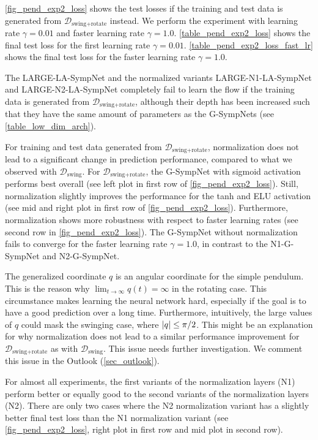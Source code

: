 \documentclass[twoside,a4paper]{article}
\begin{document}
\cref{fig_pend_exp2_loss} shows the test losses if the training and test data
is generated from $\mathcal{D}_{\text{swing+rotate}}$ instead.
We perform the experiment with learning rate $\gamma = 0.01$ and faster learning rate $\gamma = 1.0$.
\cref{table_pend_exp2_loss} shows the final test loss for the first learning rate $\gamma = 0.01$.
\cref{table_pend_exp2_loss_fast_lr} shows the final test loss for the faster learning rate $\gamma = 1.0$.

The LARGE-LA-SympNet and the normalized variants LARGE-N1-LA-SympNet and LARGE-N2-LA-SympNet completely fail to learn the
flow if the training data is generated from $\mathcal{D}_{\text{swing+rotate}}$, 
although their depth has been increased such that they have the same amount of parameters 
as the G-SympNets (see \cref{table_low_dim_arch}).

For training and test data generated from $\mathcal{D}_{\text{swing+rotate}}$, 
normalization does not lead to a significant change in prediction performance, compared to
what we observed with $\mathcal{D}_{\text{swing}}$. For $\mathcal{D}_{\text{swing+rotate}}$,
the G-SympNet with sigmoid activation performs best overall
(see left plot in first row of \cref{fig_pend_exp2_loss}). Still, normalization slightly improves the
performance for the tanh and ELU activation (see 
mid and right plot in first row of \cref{fig_pend_exp2_loss}).
Furthermore, normalization shows more robustness with respect to faster learning rates
(see second row in \cref{fig_pend_exp2_loss}). The G-SympNet without normalization fails to converge
for the faster learning rate $\gamma = 1.0$, in contrast to the N1-G-SympNet and N2-G-SympNet.

The generalized coordinate $q$ is an angular coordinate for the simple pendulum. This is the reason why 
$\lim_{t \to \infty} q(t) = \infty$
in the rotating case. This circumstance makes learning the neural network hard, especially if the
goal is to have a good prediction over a long time. 
Furthermore, intuitively, the large values of $q$ could mask the swinging case, where $\left|{q}\right| \leq \pi/2$.
This might be an explanation for why normalization does not lead to a 
similar performance improvement for $\mathcal{D}_{\text{swing+rotate}}$
as with $\mathcal{D}_{\text{swing}}$. This issue needs further investigation.
We comment this issue in the Outlook (\cref{sec_outlook}).

For almost all experiments, the first variants of the normalization layers (N1) perform better or equally good
to the second variants of the normalization layers (N2). There are only two cases where the N2 normalization variant
has a slightly better final test loss than the N1 normalization variant 
(see \cref{fig_pend_exp2_loss}, right plot in first row and mid plot in second row).
\end{document}
